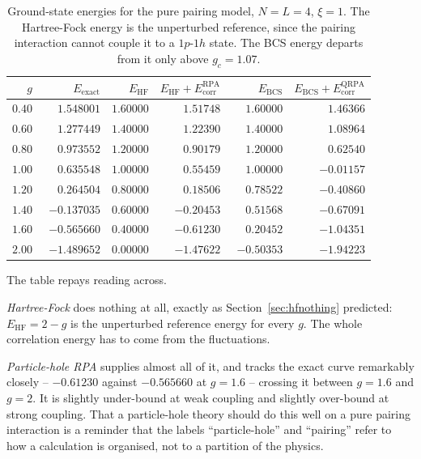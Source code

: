 \begin{table}[h]
\centering
\renewcommand{\arraystretch}{1.25}
\setlength{\tabcolsep}{9pt}
\begin{tabular}{rrrrrr}
\toprule
$g$ & $E_{\mathrm{exact}}$ & $E_{\mathrm{HF}}$
  & $E_{\mathrm{HF}}+E^{\mathrm{RPA}}_{\mathrm{corr}}$
  & $E_{\mathrm{BCS}}$
  & $E_{\mathrm{BCS}}+E^{\mathrm{QRPA}}_{\mathrm{corr}}$\\
\midrule
$0.40$ & $\phantom{-}1.548001$ & $1.60000$ & $\phantom{-}1.51748$
  & $\phantom{-}1.60000$ & $\phantom{-}1.46366$\\
$0.60$ & $\phantom{-}1.277449$ & $1.40000$ & $\phantom{-}1.22390$
  & $\phantom{-}1.40000$ & $\phantom{-}1.08964$\\
$0.80$ & $\phantom{-}0.973552$ & $1.20000$ & $\phantom{-}0.90179$
  & $\phantom{-}1.20000$ & $\phantom{-}0.62540$\\
$1.00$ & $\phantom{-}0.635548$ & $1.00000$ & $\phantom{-}0.55459$
  & $\phantom{-}1.00000$ & $-0.01157$\\
$1.20$ & $\phantom{-}0.264504$ & $0.80000$ & $\phantom{-}0.18506$
  & $\phantom{-}0.78522$ & $-0.40860$\\
$1.40$ & $-0.137035$ & $0.60000$ & $-0.20453$
  & $\phantom{-}0.51568$ & $-0.67091$\\
$1.60$ & $-0.565660$ & $0.40000$ & $-0.61230$
  & $\phantom{-}0.20452$ & $-1.04351$\\
$2.00$ & $-1.489652$ & $0.00000$ & $-1.47622$
  & $-0.50353$ & $-1.94223$\\
\bottomrule
\end{tabular}
\caption{Ground-state energies for the pure pairing model, $N=L=4$, $\xi=1$.
The Hartree-Fock energy is the unperturbed reference, since the pairing
interaction cannot couple it to a $1p$-$1h$ state.  The BCS energy departs
from it only above $g_c=1.07$.}
\label{tab:allresults}
\end{table}

The table repays reading across.

\emph{Hartree-Fock} does nothing at all, exactly as
Section~\ref{sec:hfnothing} predicted: $E_{\mathrm{HF}}=2-g$ is the
unperturbed reference energy for every $g$.  The whole correlation energy has
to come from the fluctuations.

\emph{Particle-hole RPA} supplies almost all of it, and tracks the exact curve
remarkably closely -- $-0.61230$ against $-0.565660$ at $g=1.6$ -- crossing it
between $g=1.6$ and $g=2$.  It is slightly under-bound at weak coupling and
slightly over-bound at strong coupling.  That a particle-hole theory should do
this well on a pure pairing interaction is a reminder that the labels
``particle-hole'' and ``pairing'' refer to how a calculation is organised, not
to a partition of the physics.

